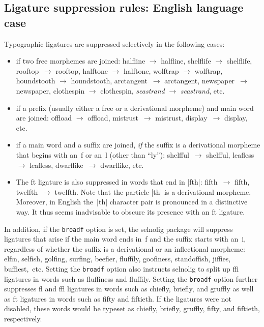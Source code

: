 \documentclass[11pt]{article}
\newcommand{\pkg}[1]{\textsf{#1}}
\newcommand{\opt}[1]{\texttt{#1}}
\newcommand{\uselig}[1]{\selnoligoff\mbox{#1}\selnoligon}
\begin{document}
\subsection{Ligature suppression rules: English language case}


Typographic ligatures are suppressed selectively in the following cases:
\begin{itemize}
\item if two free morphemes are joined: \uselig{halfline} $\to$ halfline, \uselig{shelflife} $\to$ shelflife, \uselig{rooftop}~$\to$ rooftop, \uselig{halftone} $\to$ halftone, \uselig{wolftrap} $\to$ wolftrap, \uselig{houndstooth} $\to$ houndstooth, \uselig{arctan}\-gent~$\to$ arctangent, \uselig{newspaper}~$\to$ newspaper, \uselig{clothespin} $\to$ clothespin, \emph{se\uselig{as}trand} $\to$ \emph{seastrand}, etc.

\item if a prefix (usually either a free or a derivational morpheme) and main word are joined: \uselig{offload} $\to$ offload, mi\mbox{st}rust~$\to$ mistrust, di\mbox{sp}lay~$\to$ display, etc. 

\item if a main word and a suffix are joined, \emph{if} the suffix is a derivational morpheme that begins with an~f or an~l (other than \enquote{ly}): \uselig{shelfful}~$\to$ shelfful, \uselig{leafless} $\to$ leafless, \uselig{dwarflike}~$\to$ dwarflike, etc. 

\item The ft ligature is also suppressed in words that end in |fth|: \uselig{fifth}~$\to$ fifth, \uselig{twelfth}~$\to$ twelfth. Note that the particle |th| is a derivational morpheme. Moreover, in English the~|th| character pair is pronounced in a distinctive way. It thus seems inadvisable to obscure its presence with an ft ligature.
\end{itemize}

In addition, if the \opt{broadf} option is set, the \pkg{selnolig} package will suppress ligatures that arise if the main word ends in~f and the suffix starts with an~i, regardless of whether the suffix is a derivational or an inflectional morpheme: elfin, selfish, golfing, surfing, beefier, fluffily, goofiness, standoffish, jiffies, buffiest,~etc. Setting the \opt{broadf} option also instructs \pkg{selnolig} to split up ffi ligatures in words such as fluffiness and fluffily. Setting the \opt{broadf} option further suppresses fl and ffl ligatures in words such as chiefly, briefly, and gruffly as well as ft ligatures in words such as fifty and fiftieth. If the ligatures were not disabled, these words would be typeset as chie\uselig{fl}y, brie\uselig{fl}y, gru\uselig{ffl}y, fi\uselig{ft}y, and fi\uselig{ft}ieth, respectively.
\end{document}
